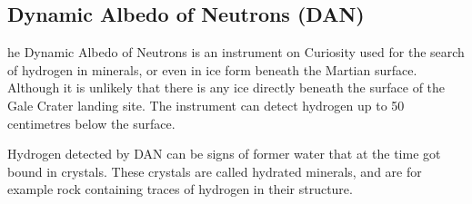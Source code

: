 \subsection*{Dynamic Albedo of Neutrons (DAN)}
he Dynamic Albedo of Neutrons is an instrument on Curiosity used for the search of hydrogen in minerals, or even in ice form beneath the Martian surface.
Although it is unlikely that there is any ice directly beneath the surface of the Gale Crater landing site.
The instrument can detect hydrogen up to 50 centimetres below the surface.

Hydrogen detected by DAN can be signs of former water that at the time got bound in crystals.
These crystals are called hydrated minerals, and are for example rock containing traces of hydrogen in their structure.